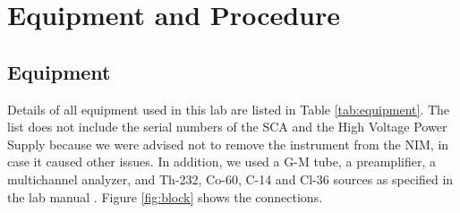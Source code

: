 \documentclass[12pt]{article}
\begin{document}
\section{Equipment and Procedure}

\subsection{Equipment}

Details of all equipment used in this lab are listed in Table \ref{tab:equipment}. The list does not include the serial numbers of the SCA and the High Voltage Power Supply because we were advised not to remove the instrument from the NIM, in case it caused other issues. In addition, we used a G-M tube, a preamplifier, a multichannel analyzer, and Th-232, Co-60, C-14 and Cl-36 sources as specified in the lab manual \cite{labmanual}. Figure \ref{fig:block} shows the connections.

\begin{table}[!htbp]
    \centering
    \caption{List of equipment used in Laboratory 4.}
    \label{tab:equipment}
\end{table}
\end{document}
